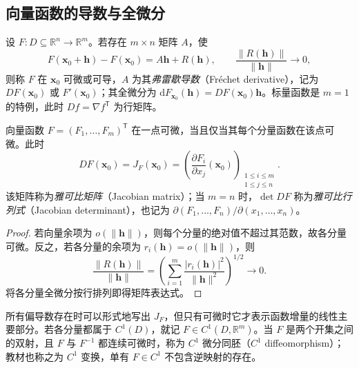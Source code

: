 \subsection{向量函数的导数与全微分}
\label{subsec:derivatives-and-total-differentials-of-vector-functions}

\begin{definition}
\label{def:frechet-derivative-and-jacobian-ch14}
设 $F:D\subseteq\mathbb R^n\to\mathbb R^m$。若存在 $m\times n$ 矩阵 $A$，使
\[
    F(\boldsymbol x_0+\boldsymbol h)-F(\boldsymbol x_0)
    =A\boldsymbol h+R(\boldsymbol h),\qquad
    \frac{\|R(\boldsymbol h)\|}{\|\boldsymbol h\|}\longrightarrow0,
\]
则称 $F$ 在 $\boldsymbol x_0$ 可微或可导，$A$ 为其\emph{弗雷歇导数}（Fr\'echet derivative），记为 $DF(\boldsymbol x_0)$ 或 $F'(\boldsymbol x_0)$；其全微分为 $\mathrm dF_{\boldsymbol x_0}(\boldsymbol h)=DF(\boldsymbol x_0)\boldsymbol h$。标量函数是 $m=1$ 的特例，此时 $Df=\nabla f^{\mathsf T}$ 为行矩阵。
\end{definition}

\begin{theorem}
\label{thm:componentwise-vector-differentiability-ch14}
向量函数 $F=(F_1,\ldots,F_m)^{\mathsf T}$ 在一点可微，当且仅当其每个分量函数在该点可微。此时
\begin{equation}
\label{eq:jacobian-matrix-ch14}
    DF(\boldsymbol x_0)=J_F(\boldsymbol x_0)
    =\left(\frac{\partial F_i}{\partial x_j}(\boldsymbol x_0)\right)_{
        \substack{1\leq i\leq m\\1\leq j\leq n}}.
\end{equation}
该矩阵称为\emph{雅可比矩阵}（Jacobian matrix）；当 $m=n$ 时，$\det DF$ 称为\emph{雅可比行列式}（Jacobian determinant），也记为 $\partial(F_1,\ldots,F_n)/\partial(x_1,\ldots,x_n)$。
\end{theorem}
\begin{proof}
若向量余项为 $o(\|\boldsymbol h\|)$，则每个分量的绝对值不超过其范数，故各分量可微。反之，若各分量的余项为 $r_i(\boldsymbol h)=o(\|\boldsymbol h\|)$，则
\[
    \frac{\|R(\boldsymbol h)\|}{\|\boldsymbol h\|}
    =\left(\sum_{i=1}^m\frac{|r_i(\boldsymbol h)|^2}{\|\boldsymbol h\|^2}\right)^{1/2}
    \longrightarrow0.
\]
将各分量全微分按行排列即得矩阵表达式。
\end{proof}

所有偏导数存在时可以形式地写出 $J_F$，但只有可微时它才表示函数增量的线性主要部分。若各分量都属于 $C^1(D)$，就记 $F\in C^1(D,\mathbb R^m)$。当 $F$ 是两个开集之间的双射，且 $F$ 与 $F^{-1}$ 都连续可微时，称为 $C^1$ 微分同胚（$C^1$ diffeomorphism）；教材也称之为 $C^1$ 变换，单有 $F\in C^1$ 不包含逆映射的存在。

